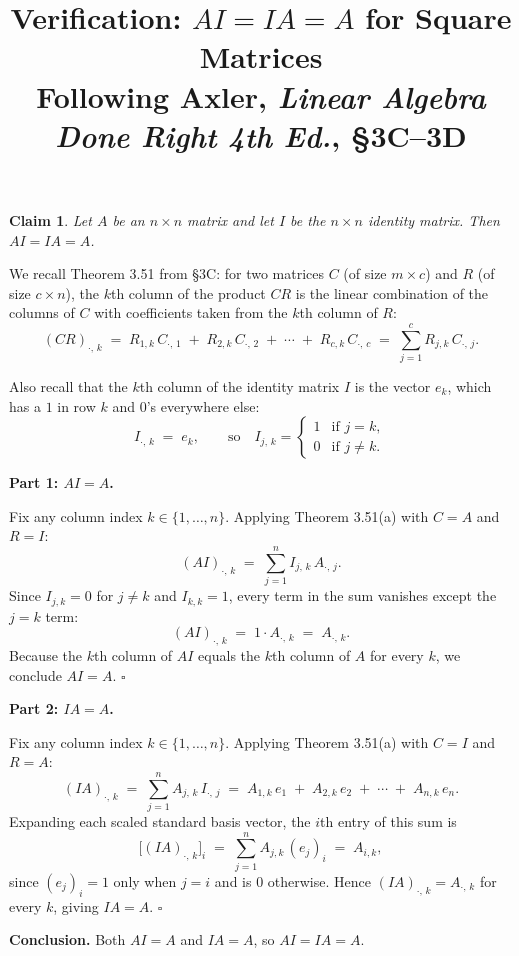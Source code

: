 \documentclass[11pt]{article}
\title{\textbf{Verification: $AI = IA = A$ for Square Matrices}\\[0.4em]
       \large Following Axler, \textit{Linear Algebra Done Right 4th Ed.}, \S 3C--3D}
\date{}
\newtheorem*{claim}{Claim}
\begin{document}
\maketitle
 
\begin{claim}
Let $A$ be an $n \times n$ matrix and let $I$ be the $n \times n$ identity matrix.
Then $AI = IA = A$.
\end{claim}
 
\medskip
 
We recall Theorem 3.51 from \S 3C: for two matrices $C$ (of size $m \times c$)
and $R$ (of size $c \times n$), the $k$th column of the product $CR$ is the linear
combination of the columns of $C$ with coefficients taken from the $k$th column
of $R$:
\[
    (CR)_{\cdot,\, k}
    \;=\;
    R_{1,k}\, C_{\cdot,\, 1}
    \;+\;
    R_{2,k}\, C_{\cdot,\, 2}
    \;+\;
    \cdots
    \;+\;
    R_{c,k}\, C_{\cdot,\, c}
    \;=\;
    \sum_{j=1}^{c} R_{j,k}\, C_{\cdot,\,j}.
\]
 
Also recall that the $k$th column of the identity matrix $I$ is the vector
$e_k$, which has a $1$ in row $k$ and $0$'s everywhere else:
\[
    I_{\cdot,\, k} \;=\; e_k, \qquad
    \text{so}\quad
    I_{j,\,k} =
    \begin{cases}
        1 & \text{if } j = k,\\
        0 & \text{if } j \neq k.
    \end{cases}
\]
 
\bigskip
 
\noindent\textbf{Part 1: $AI = A$.}
 
Fix any column index $k \in \{1, \dots, n\}$.
Applying Theorem 3.51(a) with $C = A$ and $R = I$:
\[
    (AI)_{\cdot,\, k}
    \;=\;
    \sum_{j=1}^{n} I_{j,\,k}\, A_{\cdot,\, j}.
\]
Since $I_{j,k} = 0$ for $j \neq k$ and $I_{k,k} = 1$, every term in the sum
vanishes except the $j = k$ term:
\[
    (AI)_{\cdot,\, k}
    \;=\;
    1 \cdot A_{\cdot,\, k}
    \;=\;
    A_{\cdot,\, k}.
\]
Because the $k$th column of $AI$ equals the $k$th column of $A$ for every $k$,
we conclude $AI = A$. \hfill$\square$
 
\bigskip
 
\noindent\textbf{Part 2: $IA = A$.}
 
Fix any column index $k \in \{1, \dots, n\}$.
Applying Theorem 3.51(a) with $C = I$ and $R = A$:
\[
    (IA)_{\cdot,\, k}
    \;=\;
    \sum_{j=1}^{n} A_{j,\,k}\, I_{\cdot,\, j}
    \;=\;
    A_{1,k}\, e_1
    \;+\;
    A_{2,k}\, e_2
    \;+\;
    \cdots
    \;+\;
    A_{n,k}\, e_n.
\]
Expanding each scaled standard basis vector, the $i$th entry of this sum is
\[
    \bigl[(IA)_{\cdot,\,k}\bigr]_{i}
    \;=\;
    \sum_{j=1}^{n} A_{j,k}\,(e_j)_i
    \;=\;
    A_{i,k},
\]
since $(e_j)_i = 1$ only when $j = i$ and is $0$ otherwise.
Hence $(IA)_{\cdot,\, k} = A_{\cdot,\, k}$ for every $k$, giving $IA = A$.
\hfill$\square$
 
\bigskip
 
\noindent\textbf{Conclusion.} Both $AI = A$ and $IA = A$, so $AI = IA = A$.
 
\end{document}
